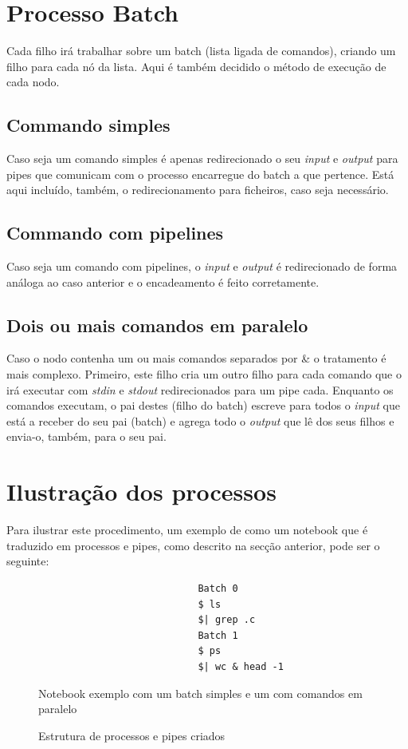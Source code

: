 \documentclass[12pt,a4paper]{report}
\begin{document}
    \section{Processo Batch}
        Cada filho irá trabalhar sobre um batch (lista ligada de comandos),
        criando um filho para cada nó da lista. Aqui é também decidido o método
        de execução de cada nodo.
        \subsection{Commando simples}
            Caso seja um comando simples é apenas redirecionado o seu
            \textit{input} e \textit{output} para pipes que comunicam com o
            processo encarregue do batch a que pertence. Está aqui incluído,
            também, o redirecionamento para ficheiros, caso seja necessário.
        \subsection{Commando com pipelines}
            Caso seja um comando com pipelines, o \textit{input} e
            \textit{output} é redirecionado de forma análoga ao caso anterior e
            o encadeamento é feito corretamente.
        \subsection{Dois ou mais comandos em paralelo}
            Caso o nodo contenha um ou mais comandos separados por \& o
            tratamento é mais complexo. Primeiro, este filho cria um outro
            filho para cada comando que o irá executar com \textit{stdin}
            e \textit{stdout} redirecionados para um pipe cada. Enquanto os
            comandos executam, o pai destes (filho do batch) escreve para todos
            o \textit{input} que está a receber do seu pai (batch) e agrega todo
            o \textit{output} que lê dos seus filhos e envia-o, também, para o
            seu pai.
\clearpage
    \section{Ilustração dos processos}
    Para ilustrar este procedimento, um exemplo de como um notebook que é
    traduzido em processos e pipes, como descrito na secção anterior, pode
    ser o seguinte:
    \begin{figure}[h]
        \begin{verbatim}
                            Batch 0
                            $ ls
                            $| grep .c
                            Batch 1
                            $ ps
                            $| wc & head -1
        \end{verbatim}
        \caption{Notebook exemplo com um batch simples e um com comandos em
                paralelo}
    \end{figure}
    \begin{figure}[h]
        
        \caption{Estrutura de processos e pipes criados}
    \end{figure}
\end{document}
